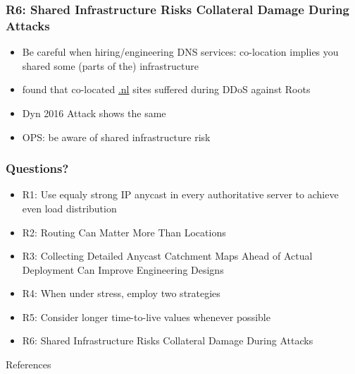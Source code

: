 \documentclass[11pt,show 
notes,notheorems,noamsthm,blank]{beamer} %
\begin{document}
\begin{frame}
 \frametitle{R6:  Shared Infrastructure Risks Collateral Damage During 
Attacks}
 \begin{itemize}
  \item Be careful when hiring/engineering DNS services: co-location implies 
you shared some (parts of the) infrastructure

\item \cite{Moura16b} found that co-located \url{.nl} sites suffered during 
DDoS against Roots
\item Dyn 2016 Attack shows the same

\item OPS: be aware of shared infrastructure risk
 \end{itemize}

\end{frame}




\begin{frame}
 \frametitle{Questions?}
 
 \begin{itemize}
  \item R1: Use equaly strong IP anycast in every authoritative server to
    achieve even load distribution~\cite{Mueller17b}
    
  \item R2:  Routing Can Matter More Than Locations~\cite{Schmidt17a}
  
  \item R3: Collecting Detailed Anycast Catchment Maps Ahead of Actual
    Deployment Can Improve Engineering Designs~\cite{Vries17b}
    
  \item R4:    When under stress, employ two strategies~\cite{Moura16b}
  
  \item R5:  Consider longer time-to-live values whenever 
possible~\cite{Moura18b}
  
    \item R6:  Shared Infrastructure Risks Collateral Damage During 
Attacks~\cite{Moura16b}
    


  

 \end{itemize}

\end{frame}



% 
%  
%  
% 
 
 \begin{frame}[allowframebreaks] {References}
 

\small

\end{frame}
 
\end{document}
